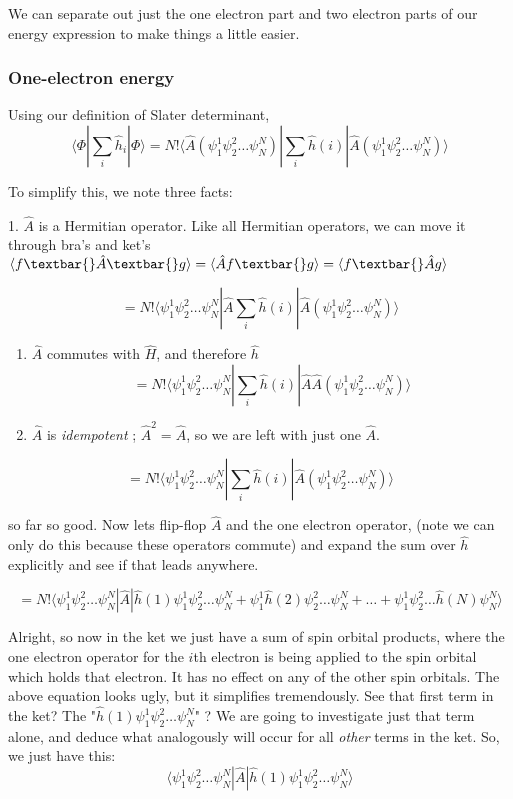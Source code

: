 \documentclass[11pt]{article}
\begin{document}
We can separate out just the one electron part and two electron parts of
our energy expression to make things a little easier.

\subsubsection{One-electron energy}
Using our definition of Slater determinant,
\[ \langle \Phi | \sum\limits_{i} \hat{h}_i | \Phi \rangle = N! \langle \hat{A} (\psi_1^1 \psi_2^2 \dots \psi_N^N) |  \sum\limits_{i} \hat{h}(i)  | \hat{A} (\psi_1^1 \psi_2^2 \dots \psi_N^N) \rangle \]

To simplify this, we note three facts: 

1. \(\hat{A}\) is a Hermitian
operator. Like all Hermitian operators, we can move it through bra's and
ket's $\langle f \textbar{} \hat{A}\textbar{} g \rangle =
\langle \hat{A} f \textbar{} g \rangle = \langle f \textbar{} \hat{A} g
\rangle $

\[ = N! \langle \psi_1^1 \psi_2^2 \dots \psi_N^N | \hat{A}  \sum\limits_{i} \hat{h}(i)  | \hat{A} (\psi_1^1 \psi_2^2 \dots \psi_N^N) \rangle \]

\begin{enumerate}
\def\labelenumi{\arabic{enumi}.}
\setcounter{enumi}{1}
\item
  \(\hat{A}\) commutes with \(\hat{H}\), and therefore \(\hat{h}\)
  \[ = N! \langle \psi_1^1 \psi_2^2 \dots \psi_N^N |  \sum\limits_{i} \hat{h}(i)  | \hat{A}  \hat{A} (\psi_1^1 \psi_2^2 \dots \psi_N^N) \rangle \]
\item
  \(\hat{A}\) is \emph{idempotent} ; \(\hat{A}^2 = \hat{A}\), so we are
  left with just one \(\hat{A}\).
\end{enumerate}

\[ = N! \langle \psi_1^1 \psi_2^2 \dots \psi_N^N |  \sum\limits_{i} \hat{h}(i)  | \hat{A} (\psi_1^1 \psi_2^2 \dots \psi_N^N) \rangle \]

    so far so good. Now lets flip-flop \(\hat{A}\) and the one electron
operator, (note we can only do this because these operators commute) and expand the sum over \(\hat{h}\)
explicitly and see if that leads anywhere.

\[ = N! \langle \psi_1^1 \psi_2^2 \dots \psi_N^N | \hat{A} |  \hat{h}(1)\psi_1^1 \psi_2^2 \dots \psi_N^N + \psi_1^1 \hat{h}(2) \psi_2^2 \dots \psi_N^N  + \dots + \psi_1^1  \psi_2^2 \dots \hat{h}(N) \psi_N^N \rangle \]

Alright, so now in the ket we just have a sum of spin orbital products,
where the one electron operator for the \(i\)th electron is being
applied to the spin orbital which holds that electron. It has no effect
on any of the other spin orbitals. The above equation looks ugly, but it
simplifies tremendously. See that first term in the ket? The 
"$\hat{h}(1)\psi_1^1 \psi_2^2 \dots \psi_N^N$" ? We are
going to investigate just that term alone, and deduce what analogously
will occur for all \emph{other} terms in the ket. So, we just have this:
\[ \langle \psi_1^1 \psi_2^2 \dots \psi_N^N | \hat{A} |  \hat{h}(1)\psi_1^1 \psi_2^2 \dots \psi_N^N \rangle \]
\end{document}

